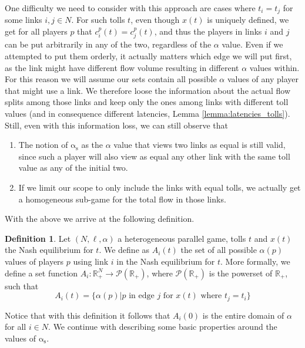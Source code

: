 \documentclass[10pt,a4paper]{book}
\newcommand{\as}{\mathrm{\alpha_s}}
\newcommand{\R}{\mathbb{R}}
\theoremstyle{definition}
\newtheorem{definition}{Definition}[chapter]
\theoremstyle{comment}
\begin{document}
One difficulty we need to consider with this approach are cases where $t_i = t_j$ for some links $i, j \in N$.
For such tolls $t$, even though $x(t)$ is uniquely defined, we get for all players $p$ that $c_i^p(t) = c_j^p(t)$, and thus the players in links $i$ and $j$ can be put arbitrarily in any of the two, regardless of the $\alpha$ value.
Even if we attempted to put them orderly, it actually matters which edge we will put first, as the link might have different flow volume resulting in different $\alpha$ values within.
For this reason we will assume our sets contain all possible $\alpha$ values of any player that might use a link.
We therefore loose the information about the actual flow splits among those links and keep only the ones among links with different toll values (and in consequence different latencies, Lemma \ref{lemma:latencies_tolls}).
Still, even with this information loss, we can still observe that
\begin{enumerate}
	\item The notion of $\as$ as the $\alpha$ value that views two links as equal is still valid, since such a player will also view as equal any other link with the same toll value as any of the initial two.
	\item If we limit our scope to only include the links with equal tolls, we actually get a homogeneous sub-game for the total flow in those links.
\end{enumerate}
With the above we arrive at the following definition.

\begin{definition}
	\label{definition:alpha_flow_sets}
	Let $(N, \ell, \alpha)$ a heterogeneous parallel game, tolls $t$ and $x(t)$ the Nash equilibrium for $t$.
	We define as $A_i(t)$ the set of all possible $\alpha(p)$ values of players $p$ using link $i$ in the Nash equilibrium for $t$.
	More formally, we define a set function $A_i: \R_+^N \rightarrow \mathcal{P}(\R_+)$, where $\mathcal{P}(\R_+)$ is the powerset of $\R_+$, such that
	\[A_i(t) = \{\alpha(p)|p \text{ in edge } j \text{ for } x(t) \text{ where } t_j = t_i\}\]
\end{definition}

Notice that with this definition it follows that $A_i(0)$ is the entire domain of $\alpha$ for all $i \in N$.
We continue with describing some basic properties around the values of $\as$.

\end{document}
